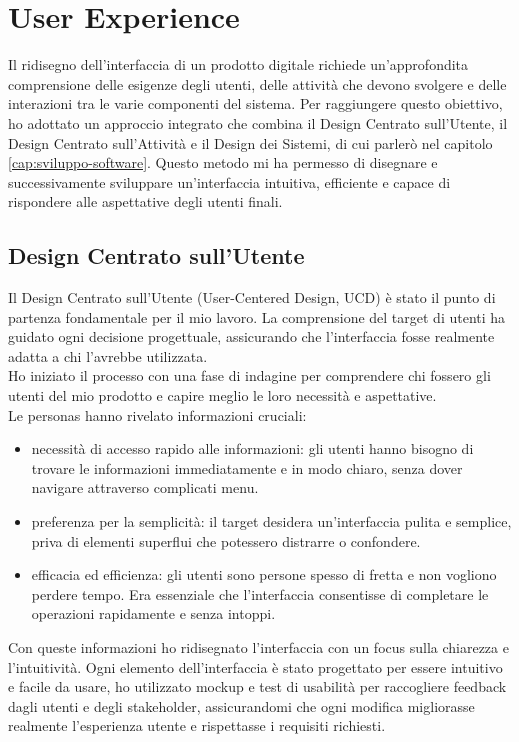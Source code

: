 \chapter{User Experience}
\label{cap:user-experience}

Il ridisegno dell'interfaccia di un prodotto digitale richiede un'approfondita comprensione delle esigenze degli utenti, delle attività che devono svolgere e delle interazioni tra le varie componenti del sistema. Per raggiungere questo obiettivo, ho adottato un approccio integrato che combina il Design Centrato sull'Utente, il Design Centrato sull'Attività e il Design dei Sistemi, di cui parlerò nel capitolo \ref{cap:sviluppo-software}. Questo metodo mi ha permesso di disegnare e successivamente sviluppare un'interfaccia intuitiva, efficiente e capace di rispondere alle aspettative degli utenti finali.

\section{Design Centrato sull'Utente}

Il Design Centrato sull'Utente (User-Centered Design, UCD) è stato il punto di partenza fondamentale per il mio lavoro. La comprensione del target di utenti ha guidato ogni decisione progettuale, assicurando che l'interfaccia fosse realmente adatta a chi l'avrebbe utilizzata.\\
Ho iniziato il processo con una fase di indagine per comprendere chi fossero gli utenti del mio prodotto e capire meglio le loro necessità e aspettative.\\

Le personas hanno rivelato informazioni cruciali:
\begin{itemize}
    \item necessità di accesso rapido alle informazioni: gli utenti hanno bisogno di trovare le informazioni immediatamente e in modo chiaro, senza dover navigare attraverso complicati menu.
    \item preferenza per la semplicità: il target desidera un'interfaccia pulita e semplice, priva di elementi superflui che potessero distrarre o confondere.
    \item efficacia ed efficienza: gli utenti sono persone spesso di fretta e non vogliono perdere tempo. Era essenziale che l'interfaccia consentisse di completare le operazioni rapidamente e senza intoppi.
\end{itemize}

Con queste informazioni ho ridisegnato l'interfaccia con un focus sulla chiarezza e l'intuitività. Ogni elemento dell'interfaccia è stato progettato per essere intuitivo e facile da usare, ho utilizzato mockup e test di usabilità per raccogliere feedback dagli utenti e degli stakeholder, assicurandomi che ogni modifica migliorasse realmente l'esperienza utente e rispettasse i requisiti richiesti.

